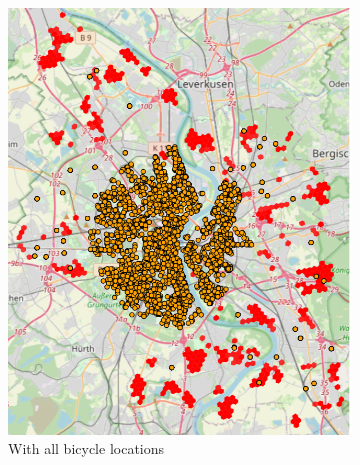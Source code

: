 \begin{figure}
\begin{subfigure}[b]{0.30\textwidth}
         \includegraphics[width=\textwidth]{Figures/results/problematic_hexagons/unfixable_with_bicycles.png}
         \caption{With all bicycle locations}
         \label{fig:unfixable_with_bicycles}
     \end{subfigure}
     \hfill
     \begin{subfigure}[b]{0.30\textwidth}
         \centering

\end{subfigure}
\end{figure}
